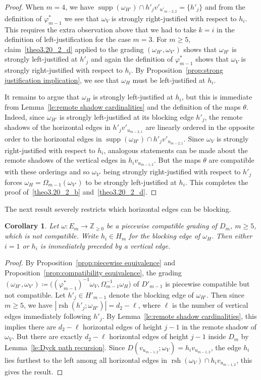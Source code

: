 \documentclass[10pt]{amsart}
\newtheorem{corollary}[theorem]{Corollary}
\theoremstyle{definition}
\newcommand{\ZZ}{\mathbb{Z}}
\DeclareMathOperator{\supp}{supp}
\DeclareMathOperator{\rsh}{rsh}
\begin{document}
\begin{proof}
 When $m=4$, we have $\supp(\omega_{H'})\cap h'_jv'_{u'_{m-2,2}}=\{h'_j\}$ and from the definition of $\varphi^*_{m-1}$ we see that $\omega_V$ is strongly right-justified with respect to $h_i$.
 This requires the extra observation above that we had to take $k=i$ in the definition of left-justification for the case $m=3$.
 For $m\ge5$, claim~\ref{theo3.20_2_d} applied to the grading $(\omega_{H'},\omega_{V'})$ shows that $\omega_{H'}$ is strongly left-justified at $h'_j$ and again the definition of $\varphi^*_{m-1}$ shows that $\omega_V$ is strongly right-justified with respect to $h_i$. 
 By Proposition~\ref{prop:strong justification implication}, we see that $\omega_H$ must be left-justified at $h_i$. 

 It remains to argue that $\omega_H$ is strongly left-justified at $h_i$, but this is immediate from Lemma~\ref{le:remote shadow cardinalities} and the definition of the maps $\theta$. 
 Indeed, since $\omega_{H'}$ is strongly left-justified at its blocking edge $h'_j$, the remote shadows of the horizontal edges in $h'_jv'_{u_{m-2,1}}$ are linearly ordered in the opposite order to the horizontal edges in $\supp(\omega_{H'})\cap h'_jv'_{u_{m-2,1}}$. 
 Since $\omega_V$ is strongly right-justified with respect to $h_i$, analogous statements can be made about the remote shadows of the vertical edges in $h_iv_{u_{m-1,2}}$. 
 But the maps $\theta$ are compatible with these orderings and so $\omega_{V'}$ being strongly right-justified with respect to $h'_j$ forces $\omega_H=\Omega_{m-1}(\omega_{V'})$ to be strongly left-justified at $h_i$.
 This completes the proof of~\ref{theo3.20_2_b} and~\ref{theo3.20_2_d}.
\end{proof}

The next result severely restricts which horizontal edges can be blocking.
\begin{corollary}
 Let $\omega:E_m\to\ZZ_{\ge0}$ be a piecewise compatible grading of $D_m$, $m\ge5$, which is not compatible.
 Write $h_i\in H_m$ for the blocking edge of $\omega_H$.
 Then either $i=1$ or $h_i$ is immediately preceded by a vertical edge.
\end{corollary}
\begin{proof}
 By Proposition~\ref{prop:piecewise equivalence} and Proposition~\ref{prop:compatibility equivalence}, the grading $(\omega_{H'},\omega_{V'})\coloneqq \big((\varphi^*_{m-1})^{-1}\omega_V,\Omega_{m-1}^{-1}\omega_H)$ of $D'_{m-1}$ is piecewise compatible but not compatible.
 Let $h'_j\in H'_{m-1}$ denote the blocking edge of $\omega_{H'}$.
 Then since $m\ge5$, we have $|\rsh(h'_j;\omega_{H'})|=d_2-\ell$, where $\ell$ is the number of vertical edges immediately following $h'_j$.
 By Lemma~\ref{le:remote shadow cardinalities}, this implies there are $d_2-\ell$ horizontal edges of height $j-1$ in the remote shadow of $\omega_V$.
 But there are exactly $d_2-\ell$ horizontal edges of height $j-1$ inside $D_m$ by Lemma~\ref{le:Dyck path recursion}.
 Since $D(v_{u_{m-1,2}};\omega_V)=h_iv_{u_{m-1,2}}$, the edge $h_i$ lies furthest to the left among all horizontal edges in $\rsh(\omega_V)\cap h_iv_{u_{m-1,2}}$, this gives the result.
\end{proof}
\end{document}
